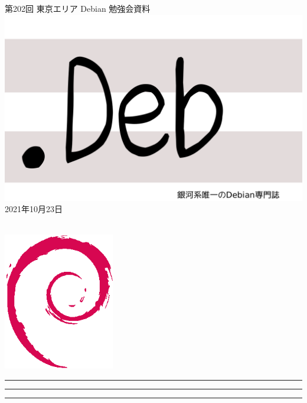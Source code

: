 \documentclass[mingoth,a4paper]{jsarticle}
\newcommand{\debmtgyear}{2021}
\newcommand{\debmtgmonth}{10}
\newcommand{\debmtgdate}{23}
\newcommand{\debmtgnumber}{202}
\begin{document}
\begin{titlepage}
\thispagestyle{empty}

\vspace*{-2cm}
第\debmtgnumber{}回 東京エリア Debian 勉強会資料\\
\hspace*{-2cm}
\includegraphics{image-assets/dotdeb.pdf}\\
\hfill{}\debmtgyear{}年\debmtgmonth{}月\debmtgdate{}日

\\

\vspace*{-2cm}
\hfill{}\includegraphics[height=6cm]{image-assets/openlogo-nd.eps}
\end{titlepage}

\newpage

\begin{minipage}[b]{0.2\hsize}
 \colorbox{titleback}{}
\end{minipage}
\begin{minipage}[b]{0.8\hsize}
\hrule
\vspace{2mm}
\hrule
\begin{multicols}{2}
\tableofcontents
\end{multicols}
\vspace{2mm}
\hrule
\end{minipage}
\end{document}
